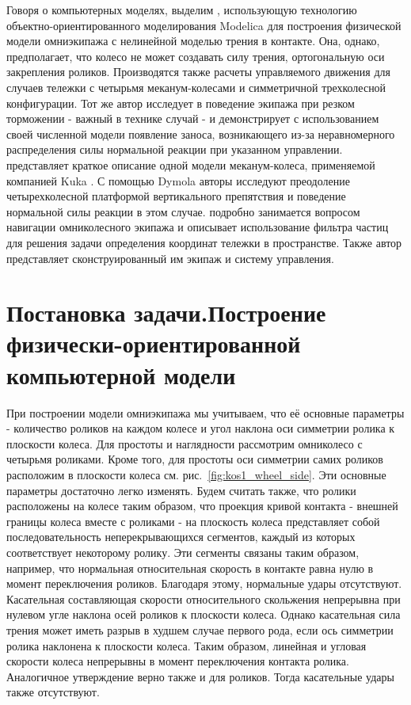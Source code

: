 \documentclass[12pt]{article}
\begin{document}
Говоря о компьютерных моделях, выделим \cite{practical}, использующую технологию объектно-ориентированного моделирования Modelica для построения физической модели омниэкипажа с нелинейной моделью трения в контакте. Она, однако, предполагает, что колесо не может создавать силу трения, ортогональную оси закрепления роликов. Производятся также расчеты управляемого движения для случаев тележки с четырьмя меканум-колесами и симметричной трехколесной конфигурации. Тот же автор исследует в \cite{kos2} поведение экипажа при резком торможении - важный в технике случай - и демонстрирует с использованием своей численной модели появление заноса, возникающего из-за неравномерного распределения силы нормальной реакции при указанном управлении. \cite{kos3} представляет краткое описание одной модели меканум-колеса, применяемой компанией Kuka \cite{kos2}. С помощью Dymola авторы исследуют преодоление четырехколесной платформой вертикального препятствия и поведение нормальной силы реакции в этом случае. \cite{particle} подробно занимается вопросом навигации омниколесного экипажа и описывает использование фильтра частиц для решения задачи определения координат тележки в пространстве. Также автор представляет сконструированный им экипаж и систему управления.

\section{Постановка задачи.\newline Построение физически-ориентированной компьютерной модели}

При построении модели омниэкипажа мы учитываем, что её основные параметры - количество роликов на каждом колесе и угол наклона оси симметрии ролика к плоскости колеса. Для простоты и наглядности рассмотрим омниколесо с четырьмя роликами. Кроме того, для простоты оси симметрии самих роликов расположим в плоскости колеса см. рис.~\ref{fig:kos1_wheel_side}. Эти основные параметры достаточно легко изменять. Будем считать также, что ролики расположены на колесе таким образом, что проекция кривой контакта - внешней границы колеса вместе с роликами - на плоскость колеса представляет собой последовательность неперекрывающихся сегментов, каждый из которых соответствует некоторому ролику. Эти сегменты связаны таким образом, например, что нормальная относительная скорость в контакте равна нулю в момент переключения роликов. Благодаря этому, нормальные удары отсутствуют. Касательная составляющая скорости относительного скольжения непрерывна при нулевом угле наклона осей роликов к плоскости колеса. Однако касательная сила трения может иметь разрыв в худшем случае первого рода, если ось симметрии ролика наклонена к плоскости колеса. Таким образом, линейная и угловая скорости колеса непрерывны в момент переключения контакта ролика. Аналогичное утверждение верно также и для роликов. Тогда касательные удары также отсутствуют.\\
\end{document}
